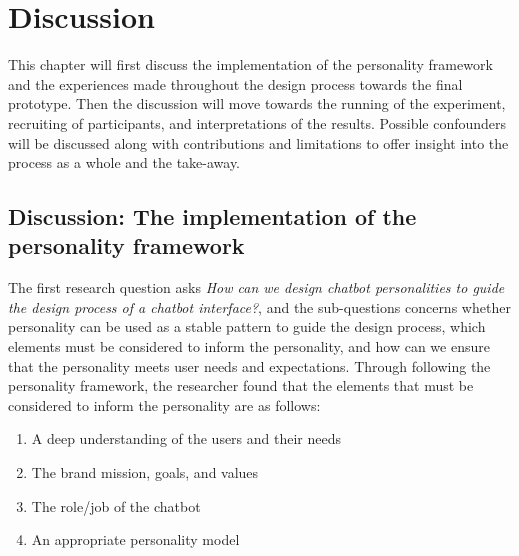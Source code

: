 \chapter{Discussion}
\label{chap:discussion}

This chapter will first discuss the implementation of the personality framework and the experiences made throughout the design process towards the final prototype. Then the discussion will move towards the running of the experiment, recruiting of  participants, and interpretations of the results. Possible confounders will be discussed along with contributions and limitations to offer insight into the process as a whole and the take-away.

\section{Discussion: The implementation of the personality framework}

The first research question asks \textit{How can we design chatbot personalities to guide the design process of a chatbot interface?}, and the sub-questions concerns whether personality can be used as a stable pattern to guide the design process, which elements must be considered to inform the personality, and how can we ensure that the personality meets user needs and expectations. Through following the personality framework, the researcher found that the elements that must be considered to inform the personality are as follows:

\begin{enumerate}
    \item A deep understanding of the users and their needs
    \item The brand mission, goals, and values
    \item The role/job of the chatbot
    \item An appropriate personality model
\end{enumerate}

